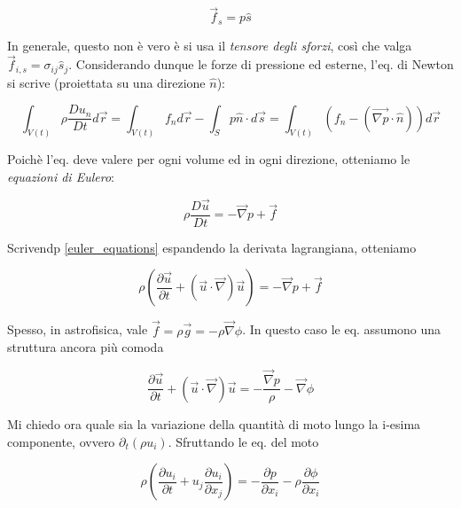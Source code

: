 \documentclass{report}
\begin{document}
\begin{equation}
    \vec{f}_s = p\hat{s}
\end{equation}

In generale, questo non è vero è si usa il \emph{tensore degli sforzi}, così che valga $\vec{f}_{i,s} = \sigma_{ij}\hat{s}_j$. Considerando dunque le forze di pressione ed esterne, l'eq. di Newton si scrive (proiettata su una direzione $\hat{n}$):

\begin{equation}
    \int_{V(t)}\rho\frac{Du_n}{Dt}d\vec{r} =  \int_{V(t)}f_nd\vec{r} - \int_Sp\hat{n}\cdot d\vec{s} = \int_{V(t)}(f_n - (\vec{\nabla p}\cdot \hat{n}))d\vec{r}
\end{equation}

Poichè l'eq. deve valere per ogni volume ed in ogni direzione, otteniamo le \emph{equazioni di Eulero}: 

\begin{tcolorbox}[colback=myg!15, colframe=black, boxrule=1pt]
\begin{equation}
    \label{euler_equations}
    \rho\frac{D\vec{u}}{Dt} = -\vec{\nabla}p + \vec{f}
\end{equation}
\end{tcolorbox}

Scrivendp \ref{euler_equations} espandendo la derivata lagrangiana, otteniamo

\begin{equation}
    \rho\left(\frac{\partial \vec{u}}{\partial t} + (\vec{u}\cdot \vec{\nabla})\vec{u}\right) = -\vec{\nabla}p + \vec{f}
\end{equation}

Spesso, in astrofisica, vale $\vec{f} = \rho\vec{g} = -\rho\vec{\nabla}\phi$. In questo caso le eq. assumono una struttura ancora più comoda 

\begin{equation}
    \frac{\partial \vec{u}}{\partial t} + (\vec{u}\cdot\vec{\nabla})\vec{u} = -\frac{\vec{\nabla}p}{\rho} - \vec{\nabla}\phi
\end{equation}

Mi chiedo ora quale sia la variazione della quantità di moto lungo la i-esima componente, ovvero $\partial_t(\rho u_i)$. Sfruttando le eq. del moto 

\begin{equation}
    \rho \left(\frac{\partial u_i}{\partial t} + u_j\frac{\partial u_i}{\partial x_j} \right) = -\frac{\partial p}{\partial x_i} -\rho\frac{\partial \phi}{\partial x_i}
\end{equation}
\end{document}
